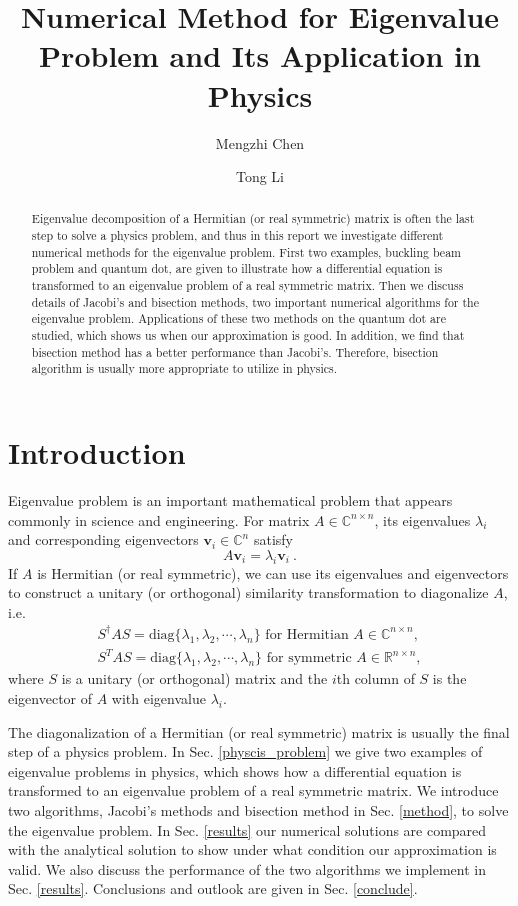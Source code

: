 \documentclass{article}
\title{Numerical Method for Eigenvalue Problem and Its Application in Physics}
\author[1]{Mengzhi Chen}
\author[1]{Tong Li}
\affil[1]{Department of Physics and Astronomy, Michigan State University}
\date{}
\begin{document}
	\maketitle
	\begin{abstract}\label{abstract}
Eigenvalue decomposition of a Hermitian (or real symmetric) matrix is often the last step to solve a physics problem, and thus 
in this report we investigate different numerical methods for the eigenvalue problem. 
First two examples, buckling beam problem and quantum dot, are given to illustrate how a differential equation is transformed 
to an eigenvalue problem of a real symmetric matrix. 
Then we discuss details of Jacobi's and bisection methods, two important numerical algorithms for the eigenvalue problem. 
Applications of these two methods on the quantum dot are studied, which shows us when our approximation is good. 
In addition, we find that bisection method has a better performance than Jacobi's. 
Therefore, bisection algorithm is usually more appropriate to utilize in physics. 
	\end{abstract}

	\section{Introduction}\label{intro}
Eigenvalue problem is an important mathematical problem that appears commonly in science and engineering. 
For matrix $A\in\mathbb{C}^{n \times n}$, its eigenvalues $\lambda_i$ and corresponding eigenvectors $\mathbf{v}_i\in\mathbb{C}^n$ satisfy
\begin{equation}
A\mathbf{v}_i=\lambda_i \mathbf{v}_i\ .
\end{equation}
If $A$ is Hermitian (or real symmetric), we can use its eigenvalues and eigenvectors to construct a unitary (or orthogonal) 
similarity transformation to diagonalize $A$, i.e. 
\begin{eqnarray}
S^{\dagger}AS=\text{diag}\{\lambda_1,\lambda_2,\cdots,\lambda_n\}\text{ for Hermitian }A\in\mathbb{C}^{n\times n}, \\
S^{T}AS=\text{diag}\{\lambda_1,\lambda_2,\cdots,\lambda_n\}\text{ for symmetric }A\in\mathbb{R}^{n\times n},
\end{eqnarray}
where $S$ is a unitary (or orthogonal) matrix and the $i$th column of $S$ is the eigenvector of $A$ with eigenvalue $\lambda_i$. 
\par
The diagonalization of a Hermitian (or real symmetric) matrix is usually the final step of a physics problem. 
In Sec. \ref{physcis_problem} we give two examples of eigenvalue problems in physics, which shows how a differential equation 
is transformed to an eigenvalue problem of a real symmetric matrix. 
We introduce two algorithms, Jacobi's methods and bisection method in Sec. \ref{method}, to solve the eigenvalue problem. 
In Sec. \ref{results} our numerical solutions are compared with the analytical solution 
to show under what condition our approximation is valid. 
We also discuss the performance of the two algorithms we implement in Sec. \ref{results}. 
Conclusions and outlook are given in Sec. \ref{conclude}. 
	
\end{document}
